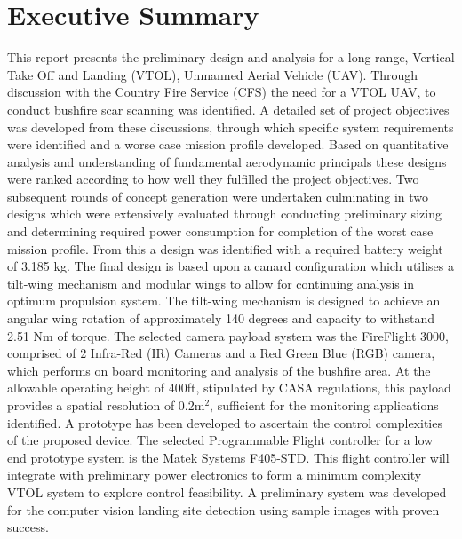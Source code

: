 \section*{Executive Summary}

This report presents the preliminary design and analysis for a long range, Vertical Take Off and Landing (VTOL), Unmanned Aerial Vehicle (UAV). Through discussion with the Country Fire Service (CFS) the need for a VTOL UAV, to conduct bushfire scar scanning was identified. A detailed set of project objectives was developed from these discussions, through which specific system requirements were identified and a worse case mission profile developed. Based on quantitative analysis and understanding of fundamental aerodynamic principals these designs were ranked according to how well they fulfilled the project objectives. Two subsequent rounds of concept generation were undertaken culminating in two designs which were extensively evaluated through conducting preliminary sizing and determining required power consumption for completion of the worst case mission profile. From this a design was identified with a required battery weight of 3.185 kg. The final design is based upon a canard configuration which utilises a tilt-wing mechanism and modular wings to allow for continuing analysis in optimum propulsion system. The tilt-wing mechanism is designed to achieve an angular wing rotation of approximately 140 degrees and capacity to withstand 2.51 Nm of torque. The selected camera payload system was the FireFlight 3000, comprised of 2 Infra-Red (IR) Cameras and a Red Green Blue (RGB) camera, which performs on board monitoring and analysis of the bushfire area. At the allowable operating height of 400ft, stipulated by CASA regulations, this payload provides a spatial resolution of {0.2m$^2$}, sufficient for the monitoring applications identified. A prototype has been developed to ascertain the control complexities of the proposed device. The selected Programmable Flight controller for a low end prototype system is the Matek Systems F405-STD. This flight controller will integrate with preliminary power electronics to form a minimum complexity VTOL system to explore control feasibility. A preliminary system was developed for the computer vision landing site detection using sample images with proven success. \\

